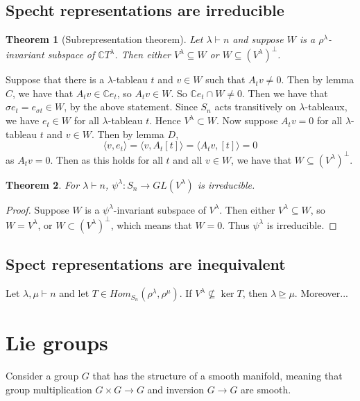 \documentclass[]{report}
\newtheorem{theorem}{Theorem}
\theoremstyle{definition}
\numberwithin{theorem}{section}
\numberwithin{equation}{section}
\begin{document}
\subsection{Specht representations are irreducible}
\begin{theorem}[Subrepresentation theorem]
	Let $\lambda \vdash n$ and suppose $W$ is a $\rho^\lambda$-invariant subspace of $\mathbb{C} T^\lambda$. Then either $V^\lambda \subseteq W$ or $W \subseteq (V^\lambda)^\perp$. 
\end{theorem}

Suppose that there is a $\lambda$-tableau $t$ and $v \in W$ such that $A_t v \neq 0$. Then by lemma $C$, we have that $A_t v \in \mathbb{C} e_t$, so $A_t v \in W$. So $\mathbb{C} e_t \cap W \neq 0$. Then we have that $\sigma e_t = e_{\sigma t} \in W$, by the above statement. Since $S_n$ acts transitively on $\lambda$-tableaux, we have $e_t \in W$ for all $\lambda$-tableau $t$. Hence $V^\lambda \subset W$. Now suppose $A_t v = 0$ for all $\lambda$-tableau $t$ and $v \in W$. Then by lemma $D$,
\begin{equation}
	\langle v, e_t \rangle = \langle v, A_t[t] \rangle = \langle A_t v, [t] \rangle = 0
\end{equation}
as $A_t v = 0$. Then as this holds for all $t$ and all $v \in W$, we have that $W \subseteq (V^\lambda)^\perp$. 


\begin{theorem}
	For $\lambda \vdash n$, $\psi^\lambda : S_n \rightarrow GL(V^\lambda)$ is irreducible.
\end{theorem}

\begin{proof}
	Suppose $W$ is a $\psi^\lambda$-invariant subspace of $V^\lambda$. Then either $V^\lambda \subseteq W$, so $W = V^\lambda$, or $W \subset (V^\lambda)^\perp$, which means that $W = 0$. Thus $\psi^\lambda$ is irreducible.
\end{proof}
\subsection{Spect representations are inequivalent}
Let $\lambda, \mu \vdash n$ and let $T \in Hom_{S_n}(\rho^\lambda, \rho^\mu)$. If $V^\lambda \nsubseteq \ker T$, then $\lambda \unrhd \mu$. Moreover...


\section{Lie groups}
Consider a group $G$ that has the structure of a smooth manifold, meaning that group multiplication $G \times G \rightarrow G$ and inversion $G \rightarrow G$ are smooth. 
\end{document}
